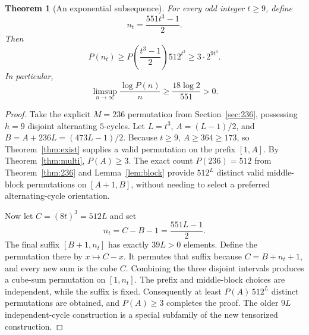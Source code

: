 \documentclass[10pt]{article}
\newtheorem{theorem}{Theorem}
\begin{document}
\begin{theorem}[An exponential subsequence]
\label{thm:exponential-subsequence}
For every odd integer $t\ge9$, define
\[
\boxed{n_t=\frac{551t^3-1}{2}.}
\]
Then
\[
\boxed{P(n_t)\ge
P\!\left(\frac{t^3-1}{2}\right)512^{t^3}
\ge 3\cdot 2^{9t^3}.}
\]
In particular,
\[
\boxed{\displaystyle
\limsup_{n\to\infty}\frac{\log P(n)}n
 \ge\frac{18\log2}{551}>0.}
\]
\end{theorem}
\begin{proof}
Take the explicit $M=236$ permutation
from Section~\ref{sec:236}, possessing $h=9$
disjoint alternating $5$-cycles.
Let $L=t^3$, $A=(L-1)/2$, and
$B=A+236L=(473L-1)/2$.
Because $t\ge9$, $A\ge364\ge173$,
so Theorem~\ref{thm:exist} supplies a valid
permutation on the prefix $[1,A]$.
By Theorem~\ref{thm:multi}, $P(A)\ge3$.
The exact count $P(236)=512$ from
Theorem~\ref{thm:236} and
Lemma~\ref{lem:block} provide $512^L$
distinct valid middle-block permutations
on $[A+1,B]$, without needing to select
a preferred alternating-cycle orientation.

Now let $C=(8t)^3=512L$ and set
\[
n_t=C-B-1=\frac{551L-1}{2}.
\]
The final suffix $[B+1,n_t]$ has exactly
$39L>0$ elements. Define the permutation
there by $x\mapsto C-x$.
It permutes that suffix because
$C=B+n_t+1$, and every new sum is the cube
$C$. Combining the three disjoint intervals
produces a cube-sum permutation on $[1,n_t]$.
The prefix and middle-block choices are
independent, while the suffix is fixed.
Consequently at least $P(A)\,512^L$
distinct permutations are obtained, and
$P(A)\ge3$ completes the proof.
The older $9L$ independent-cycle construction
is a special subfamily of the new tensorized
construction.
\end{proof}
\end{document}
